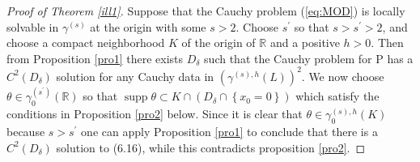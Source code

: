 \documentclass{article}
\def\R{\mathbb{R}}
\newtheorem{remark}[theorem]{Remark}
\begin{document}
\begin{proof}[Proof of Theorem \ref{ill1}]
	
Suppose that the Cauchy problem  (\ref{eq:MOD}) is locally solvable in \(\gamma^{(s)}\) at
the origin with some \(s>2\).
Choose \(s^{\prime}\) so that \(s>s^{\prime}>2\),  and choose a compact
neighborhood \(K\) of the origin of \(\R\) and a positive
\(h>0\).
Then from Proposition \ref{pro1} there exists \(D_{\delta}\) such that
the Cauchy problem for \(\mathrm{P}\) has a \(C^{2}\left(D_{\delta}\right)\)
solution for any Cauchy data in \(\left(\gamma^{(s),
    h}(L)\right)^{2}\). We now choose
 \(\theta \in \gamma_{0}^{\left(s^{\prime}\right)}(\R)\) so
that \(\operatorname{supp}  \theta \subset K
\cap\left(D_{\delta} \cap\left\{x_{0}=0\right\}\right)\) which satisfy
the conditions in Proposition \ref{pro2} below. Since it is clear that \(
\theta \in \gamma_{0}^{(s), h}(K)\) because \(s>s^{\prime}\) one can
apply Proposition \ref{pro1} to conclude that there is a
\(C^{2}\left(D_{\delta}\right)\) solution to (6.16),  while this
contradicts  proposition \ref{pro2}.
\end{proof}






\end{document}
